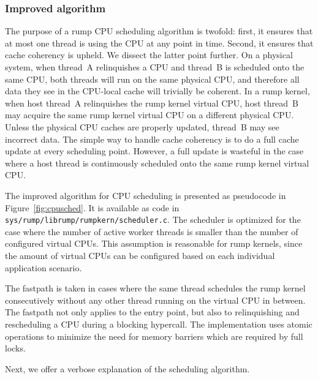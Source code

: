 \subsubsection*{Improved algorithm}

The purpose of a rump CPU scheduling algorithm is twofold: first,
it ensures that at most one thread is using the CPU at any point
in time.  Second, it ensures that cache coherency is upheld.  We
dissect the latter point further.  On a physical system, when
thread~A relinquishes a CPU and thread~B is scheduled onto the same
CPU, both threads will run on the same physical CPU, and therefore
all data they see in the CPU-local cache will trivially be coherent.
In a rump kernel, when host thread~A relinquishes the rump kernel
virtual CPU, host thread~B may acquire the same rump kernel virtual
CPU on a different physical CPU.  Unless the physical CPU caches are
properly updated, thread~B may see incorrect data.  The simple way
to handle cache coherency is to do a full cache update at every
scheduling point.  However, a full update is wasteful in the case
where a host thread is continuously scheduled onto the same rump kernel
virtual CPU.

The improved algorithm for CPU scheduling is presented as pseudocode
in Figure~\ref{fig:cpusched}.  It is available as code in
\texttt{sys/rump/librump/rumpkern/scheduler.c}.  The scheduler is optimized
for the case where the number of active worker threads is smaller
than the number of configured virtual CPUs.  This assumption is
reasonable for rump kernels, since the amount of virtual CPUs can
be configured based on each individual application scenario.

The fastpath is taken in cases where the same thread schedules the
rump kernel consecutively without any other thread running on the
virtual CPU in between.  The fastpath not only applies to the entry
point, but also to relinquishing and rescheduling a CPU during a blocking
hypercall.  The implementation uses atomic operations to minimize the
need for memory barriers which are required by full locks.

Next, we offer a verbose explanation of the scheduling algorithm.

